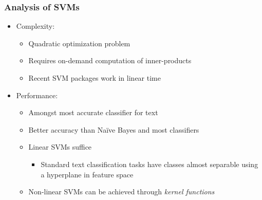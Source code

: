 \documentclass{beamer}
\begin{document}

\begin{frame} \frametitle{Analysis of SVMs}
  
  \begin{itemize}
  \item Complexity:
    \begin{itemize}
    \item Quadratic optimization problem
    \item Requires on-demand computation of inner-products
    \item Recent SVM packages work in linear time
    \end{itemize}
  \item Performance:
    \begin{itemize}
    \item Amongst most accurate classifier for text
    \item Better accuracy than Na{\"i}ve Bayes and most classifiers
    \item Linear SVMs suffice
      \begin{itemize}
      \item Standard text classification tasks have classes almost separable
        using a hyperplane in feature space
      \end{itemize}
    \item Non-linear SVMs can be achieved through \emph{kernel functions}
    \end{itemize}
  \end{itemize}

\end{frame}



  
\end{document}
